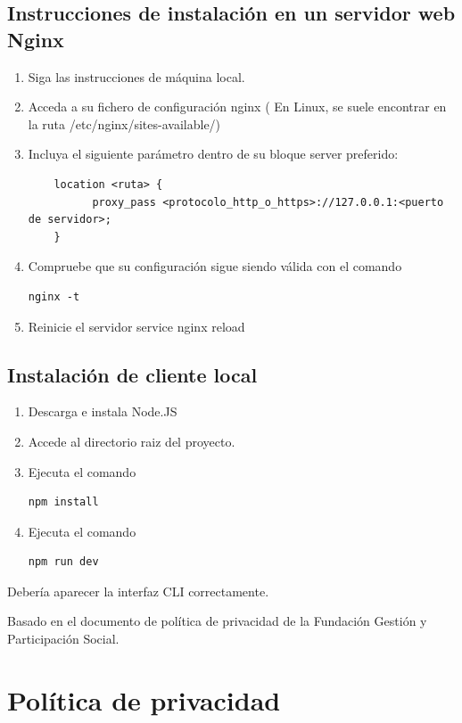 \documentclass[12pt,a4paper,twoside,openright]{book}
\begin{document}
\begin{umaappendices}
\subsection{Instrucciones de instalación en un servidor web Nginx}

\begin{enumerate}
  \item Siga las instrucciones de máquina local.
  \item Acceda a su fichero de configuración nginx ( En Linux, se suele encontrar en la ruta /etc/nginx/sites-available/)
  \item Incluya el siguiente parámetro dentro de su bloque server preferido: \begin{verbatim}
    location <ruta> {
		  proxy_pass <protocolo_http_o_https>://127.0.0.1:<puerto de servidor>;
    } 
  \end{verbatim}
  \item Compruebe que su configuración sigue siendo válida con el comando \begin{verbatim}nginx -t\end{verbatim}
  \item Reinicie el servidor service nginx reload
\end{enumerate}


\subsection{Instalación de cliente local}
\begin{enumerate}
  \item Descarga e instala Node.JS
  \item Accede al directorio raiz del proyecto.
  \item Ejecuta el comando \begin{verbatim}npm install\end{verbatim}
  \item Ejecuta el comando \begin{verbatim}npm run dev\end{verbatim}
\end{enumerate}

Debería aparecer la interfaz CLI correctamente.


Basado en el documento de política de privacidad de la Fundación Gestión y Participación Social. \cite{politicaprivacidad1}

\section{Política de privacidad}


\end{umaappendices}
\end{document}
